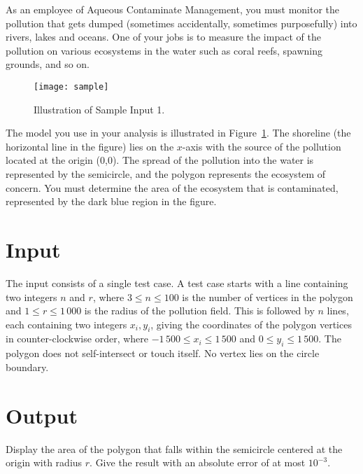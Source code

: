
As an employee of Aqueous Contaminate Management, you must monitor the
pollution that gets dumped (sometimes accidentally, sometimes
purposefully) into rivers, lakes and oceans.  One of your jobs is to
measure the impact of the pollution on various ecosystems in the water
such as coral reefs, spawning grounds, and so on.

\begin{figure}[!h]
\centering
\texttt{[image: sample]}
\caption{Illustration of Sample Input 1.}
\label{fig:pollution}
\end{figure}

The model you use in your analysis is illustrated in
Figure~\ref{fig:pollution}.  The shoreline (the horizontal line in the
figure) lies on the $x$-axis with the source of the pollution located
at the origin (0,0).  The spread of the pollution into the water is
represented by the semicircle, and the polygon represents the
ecosystem of concern.  You must determine the area of the ecosystem
that is contaminated, represented by the dark blue region in the
figure.

\section*{Input}

The input consists of a single test case.  A test case starts with a line containing two integers $n$ and $r$, where $3 \le n \le 100$ is the number of vertices in the polygon and $1 \le r \le 1\,000$ is the radius of the pollution field.  This is followed by $n$ lines, each containing two integers $x_i, y_i$, giving the coordinates of the polygon vertices in counter-clockwise order, where $-1\,500 \le x_i \le 1\,500$ and $0 \le y_i \le 1\,500$.  The polygon does not self-intersect or touch itself.  No vertex lies on the circle boundary.

\section*{Output}

Display the area of the polygon that falls within the semicircle
centered at the origin with radius $r$.  Give the result
with an absolute error of at most $10^{-3}$.
